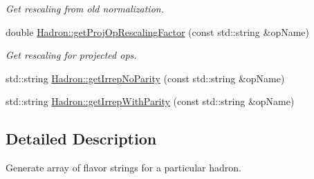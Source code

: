 \begin{DoxyCompactItemize}
\begin{DoxyCompactList}\small\item\em Get rescaling from old normalization. \end{DoxyCompactList}\item 
double \mbox{\hyperlink{namespaceHadron_aeb564a291631b101c405d7f4257391f8}{Hadron\+::get\+Proj\+Op\+Rescaling\+Factor}} (const std\+::string \&op\+Name)
\begin{DoxyCompactList}\small\item\em Get rescaling for projected ops. \end{DoxyCompactList}\item 
std\+::string \mbox{\hyperlink{namespaceHadron_ae2543483bce4c1e4b6c9ca56d01fe9ac}{Hadron\+::get\+Irrep\+No\+Parity}} (const std\+::string \&op\+Name)
\item 
std\+::string \mbox{\hyperlink{namespaceHadron_a0f40c5d7e590d17294e0a27e231c0a4b}{Hadron\+::get\+Irrep\+With\+Parity}} (const std\+::string \&op\+Name)
\end{DoxyCompactItemize}


\subsection{Detailed Description}
Generate array of flavor strings for a particular hadron. 


